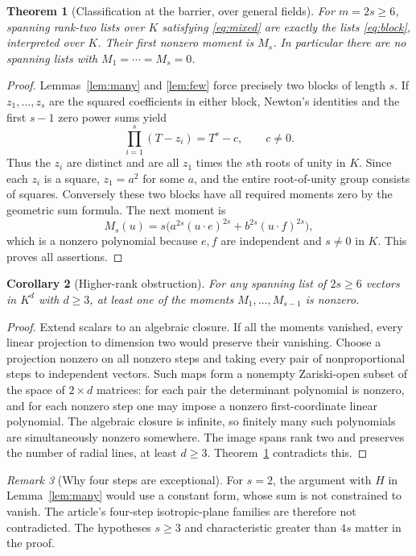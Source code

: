 \documentclass[11pt]{article}
\newtheorem{theorem}{Theorem}[section]
\newtheorem{corollary}[theorem]{Corollary}
\theoremstyle{remark}\newtheorem{remark}[theorem]{Remark}
\begin{document}
\begin{theorem}[Classification at the barrier, over general fields]\label{thm:rigidity}
For $m=2s\ge6$, spanning rank-two lists over $K$ satisfying \eqref{eq:mixed} are exactly the lists \eqref{eq:block}, interpreted over $K$. Their first nonzero moment is $M_s$. In particular there are no spanning lists with $M_1=\cdots=M_s=0$.
\end{theorem}
\begin{proof}
Lemmas~\ref{lem:many} and \ref{lem:few} force precisely two blocks of length $s$. If $z_1,\ldots,z_s$ are the squared coefficients in either block, Newton's identities and the first $s-1$ zero power sums yield
\[
 \prod_{i=1}^s(T-z_i)=T^s-c,
 \qquad c\ne0.
\]
Thus the $z_i$ are distinct and are all $z_1$ times the $s$th roots of unity in $K$. Since each $z_i$ is a square, $z_1=a^2$ for some $a$, and the entire root-of-unity group consists of squares. Conversely these two blocks have all required moments zero by the geometric sum formula. The next moment is
\[
 M_s(u)=s\big(a^{2s}(u\cdot e)^{2s}+b^{2s}(u\cdot f)^{2s}\big),
\]
which is a nonzero polynomial because $e,f$ are independent and $s\ne0$ in $K$. This proves all assertions.
\end{proof}

\begin{corollary}[Higher-rank obstruction]\label{cor:rank}
For any spanning list of $2s\ge6$ vectors in $K^d$ with $d\ge3$, at least one of the moments $M_1,\ldots,M_{s-1}$ is nonzero.
\end{corollary}
\begin{proof}
Extend scalars to an algebraic closure. If all the moments vanished, every linear projection to dimension two would preserve their vanishing. Choose a projection nonzero on all nonzero steps and taking every pair of nonproportional steps to independent vectors. Such maps form a nonempty Zariski-open subset of the space of $2\times d$ matrices: for each pair the determinant polynomial is nonzero, and for each nonzero step one may impose a nonzero first-coordinate linear polynomial. The algebraic closure is infinite, so finitely many such polynomials are simultaneously nonzero somewhere. The image spans rank two and preserves the number of radial lines, at least $d\ge3$. Theorem~\ref{thm:rigidity} contradicts this.
\end{proof}

\begin{remark}[Why four steps are exceptional]
For $s=2$, the argument with $H$ in Lemma~\ref{lem:many} would use a constant form, whose sum is not constrained to vanish. The article's four-step isotropic-plane families are therefore not contradicted. The hypotheses $s\ge3$ and characteristic greater than $4s$ matter in the proof.
\end{remark}
\end{document}
